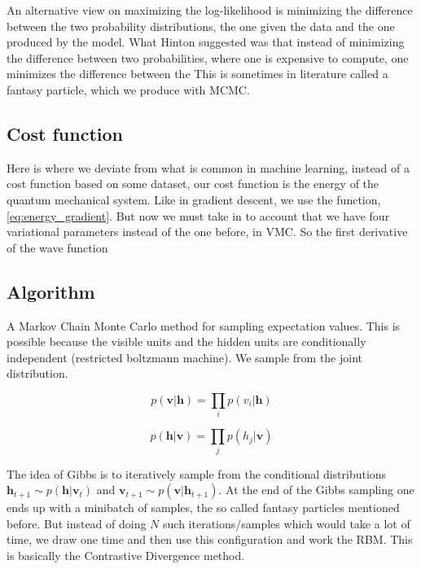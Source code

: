 An alternative view on maximizing the log-likelihood is minimizing the difference between the two probability distributions, the one given the data and the one produced by the model. 
What Hinton suggested was that instead of minimizing the difference between two probabilities, where one is expensive to compute, one minimizes the difference between the 
This is sometimes in literature called a fantasy particle, which we produce with MCMC. 

\subsection{Cost function}

Here is where we deviate from what is common in machine learning, instead of a cost function based on some dataset, our cost function is the energy of the quantum mechanical system. Like in gradient descent, we use the function, \eqref{eq:energy_gradient}. 
But now we must take in to account that we have four variational parameters instead of the one before, in VMC. So the first derivative of the wave function  

\subsection{Algorithm}

\cite{marsland2014machine}

A Markov Chain Monte Carlo method for sampling expectation values. This is possible because the visible units and the hidden units are conditionally independent (restricted boltzmann machine). We sample from the joint distribution. 

\begin{equation}
p(\mathbf{v}|\mathbf{h}) = \prod_i p(v_i|\mathbf{h})
\end{equation}

\begin{equation}
p(\mathbf{h}|\mathbf{v}) = \prod_j p(h_j|\mathbf{v})
\end{equation}

The idea of Gibbs is to iteratively sample from the conditional distributions $\mathbf{h}_{t+1} \sim p(\mathbf{h}|\mathbf{v}_t)$ and $\mathbf{v}_{t+1} \sim p(\mathbf{v}|\mathbf{h}_{t+1})$. At the end of the Gibbs sampling one ends up with a minibatch of samples, the so called fantasy particles mentioned before. But instead of doing $N$ such iterations/samples which would take a lot of time, we draw one time and then use this configuration and work the RBM. This is basically the Contrastive Divergence method. 


